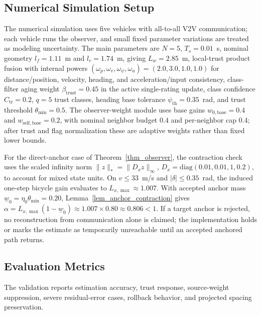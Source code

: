 \documentclass[letterpaper,journal]{IEEEtran}
\begin{document}
\subsection{Numerical Simulation Setup}

The numerical simulation uses five vehicles with all-to-all V2V communication; each vehicle runs the observer, and small fixed parameter variations are treated as modeling uncertainty. The main parameters are $N=5$, $T_s=0.01$~s, nominal geometry $l_f=1.11$~m and $l_r=1.74$~m, giving $L_w=2.85$~m, local-trust product fusion with internal powers $(\omega_p,\omega_v,\omega_\psi,\omega_u)=(2.0,3.0,1.0,1.0)$ for distance/position, velocity, heading, and acceleration/input consistency, class-filter aging weight $\beta_{\text{trust}}=0.45$ in the active single-rating update, class confidence $C_{\mathrm{tr}}=0.2$, $q=5$ trust classes, heading base tolerance $\psi_{\mathrm{th}}=0.35$~rad, and trust threshold $\theta_{\min}=0.5$. The observer-weight module uses base gains $w_{0,\mathrm{base}}=0.4$ and $w_{\mathrm{self,base}}=0.2$, with nominal neighbor budget $0.4$ and per-neighbor cap $0.4$; after trust and flag normalization these are adaptive weights rather than fixed lower bounds.

For the direct-anchor case of Theorem~\ref{thm_observer}, the contraction check uses the scaled infinity norm $\|z\|_* = \|D_x z\|_\infty$, $D_x=\mathrm{diag}(0.01,0.01,1,0.2)$, to account for mixed state units. On $v\le33$~m/s and $|\delta|\le0.35$~rad, the induced one-step bicycle gain evaluates to $L_{x,\max}\approx1.007$. With accepted anchor mass $\underline w_0=\eta_0\theta_{\min}=0.20$, Lemma~\ref{lem_anchor_contraction} gives $\alpha=L_{x,\max}(1-\underline w_0)\approx1.007\times0.80\approx0.806<1$. If a target anchor is rejected, no reconstruction from communication alone is claimed; the implementation holds or marks the estimate as temporarily unreachable until an accepted anchored path returns.

\subsection{Evaluation Metrics}
The validation reports estimation accuracy, trust response, source-weight suppression, severe residual-error cases, rollback behavior, and projected spacing preservation.
\end{document}
